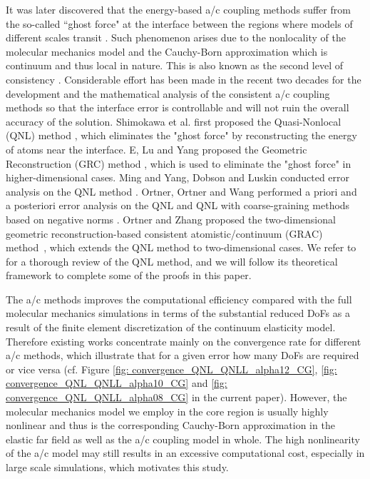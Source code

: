 It was later discovered that the energy-based a/c coupling methods suffer from the so-called ``ghost force" at the interface between the regions where models of different scales transit \cite{1999_VS_RM_ETadmor_MOrtiz_AFEM_QC_JMPS}. Such phenomenon arises due to the nonlocality of the molecular mechanics model and the Cauchy-Born approximation which is continuum and thus local in nature. This is also known as the second level of consistency \cite{2012_WE_Principles_Multi_Model}. Considerable effort has been made in the recent two decades for the development and the mathematical analysis of the consistent a/c coupling methods so that the interface error is controllable and will not ruin the overall accuracy of the solution. Shimokawa et al. first proposed the Quasi-Nonlocal (QNL) method \cite{2004_Shimokawa_QCM_ErrAna_PRB}, which eliminates the "ghost force" by reconstructing the energy of atoms near the interface. E, Lu and Yang proposed the Geometric Reconstruction (GRC) method \cite{2006_WE_JL_ZY_GRC_PRB}, which is used to eliminate the "ghost force" in higher-dimensional cases. Ming and Yang, Dobson and Luskin conducted error analysis on the QNL method \cite{2009_PM_ZY_1D_QC_Nonlocal_MMS,2009_MD_ML_Optimal_Order_SIMNUM}. Ortner, Ortner and Wang performed a priori and a posteriori error analysis on the QNL and QNL with coarse-graining methods based on negative norms \cite{2011_CO_1D_QNL_MATHCOMP,2011_CO_HW_QC_A_Priori_1D_M3AS}. Ortner and Zhang proposed the two-dimensional geometric reconstruction-based consistent atomistic/continuum (GRAC) method~\cite{2012_CO_LZ_GRAC_Construction_SIAMNUM,2014_CO_LZ_GRAC_Coeff_Optim_CMAME}, which extends the QNL method to two-dimensional cases. We refer to \cite{2013_ML_CO_AC_Coupling_ACTANUM} for a thorough review of the QNL method, and we will follow its theoretical framework to complete some of the proofs in this paper.

The a/c methods improves the computational efficiency compared with the full molecular mechanics simulations in terms of the substantial reduced DoFs as a result of the finite element discretization of the continuum elasticity model. Therefore existing works concentrate mainly on the convergence rate for different a/c methods, which illustrate that for a given error how many DoFs are required or vice versa \cite{1980_MB_CM_WW_Dislocation_Near_Crack_JM,1982_MM_MD_Crack_Boundary_PMA,1989_HF_HE_MP_Metals_Composite_Materials_ZM,1991_SK_PG_HF_Crack_FEM_PMA} (cf. Figure \ref{fig: convergence_QNL_QNLL_alpha12_CG}, \ref{fig: convergence_QNL_QNLL_alpha10_CG} and \ref{fig: convergence_QNL_QNLL_alpha08_CG} in the current paper). However, the molecular mechanics model we employ in the core region is usually highly nonlinear and thus is the corresponding Cauchy-Born approximation in the elastic far field as well as the a/c coupling model in whole. The high nonlinearity of the a/c model may still results in an excessive computational cost, especially in large scale simulations, which motivates this study. 


